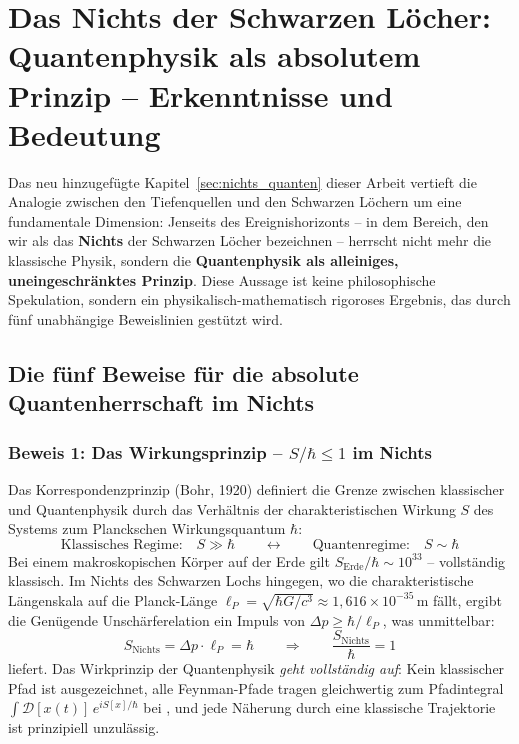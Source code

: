 ﻿\documentclass[12pt,a4paper]{report}
\begin{document}
\section{Das Nichts der Schwarzen Löcher: Quantenphysik als absolutem Prinzip -- Erkenntnisse und Bedeutung}
\label{sec:zusammenfassung_quanten}

Das neu hinzugefügte Kapitel~\ref{sec:nichts_quanten} dieser Arbeit vertieft die Analogie zwischen den Tiefenquellen und den Schwarzen Löchern um eine fundamentale Dimension: Jenseits des Ereignishorizonts -- in dem Bereich, den wir als das \textbf{Nichts} der Schwarzen Löcher bezeichnen -- herrscht nicht mehr die klassische Physik, sondern die \textbf{Quantenphysik als alleiniges, uneingeschränktes Prinzip}. Diese Aussage ist keine philosophische Spekulation, sondern ein physikalisch-mathematisch rigoroses Ergebnis, das durch fünf unabhängige Beweislinien gestützt wird.

\subsection{Die fünf Beweise für die absolute Quantenherrschaft im Nichts}

\subsubsection{Beweis 1: Das Wirkungsprinzip -- $S/\hbar \leq 1$ im Nichts}

Das Korrespondenzprinzip (Bohr, 1920) definiert die Grenze zwischen klassischer und Quantenphysik durch das Verhältnis der charakteristischen Wirkung $S$ des Systems zum Planckschen Wirkungsquantum $\hbar$:
\begin{equation*}
    \text{Klassisches Regime:}\quad S \gg \hbar \qquad \longleftrightarrow \qquad \text{Quantenregime:}\quad S \sim \hbar
\end{equation*}
Bei einem makroskopischen Körper auf der Erde gilt $S_{\mathrm{Erde}}/\hbar \sim 10^{33}$ -- vollständig klassisch. Im Nichts des Schwarzen Lochs hingegen, wo die charakteristische Längenskala auf die Planck-Länge $\ell_P = \sqrt{\hbar G / c^3} \approx 1{,}616 \times 10^{-35}\,\text{m}$ fällt, ergibt die Genügende Unschärferelation ein Impuls von $\Delta p \geq \hbar/\ell_P$, was unmittelbar:
\begin{equation*}
    S_{\mathrm{Nichts}} = \Delta p \cdot \ell_P = \hbar \qquad \Longrightarrow \qquad \frac{S_{\mathrm{Nichts}}}{\hbar} = 1
\end{equation*}
liefert. Das Wirkprinzip der Quantenphysik \emph{geht vollständig auf}: Kein klassischer Pfad ist ausgezeichnet, alle Feynman-Pfade tragen gleichwertig zum Pfadintegral $\int \mathcal{D}[x(t)]\,e^{iS[x]/\hbar}$ bei \cite{feynman1965}, und jede Näherung durch eine klassische Trajektorie ist prinzipiell unzulässig.
\end{document}
